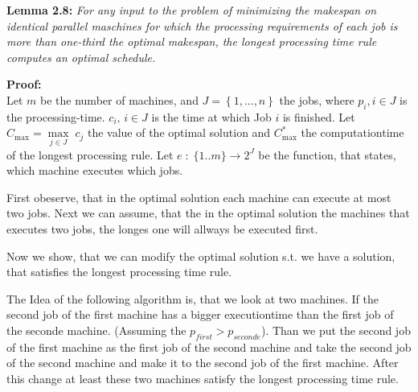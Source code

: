 \documentclass[11pt,a4paper,ngerman]{article}
\begin{document}
\begin{description}
    \item{\bfseries Lemma 2.8:} 
        {\rmfamily\itshape
            For any input to the problem of minimizing the makespan on
            identical parallel maschines for which the processing
            requirements of each job is more than one-third the 
            optimal makespan, the longest processing time rule
            computes an optimal schedule.
        }
    \item{\bfseries Proof:}\\
        Let $m$ be the number of machines, and 
        $J = \left\{ 1,... ,n\right\}$ the jobs, where $p_i, i \in J$
        is the processing-time. $c_i, \, i \in J$ is the time at which
        Job $i$ is finished.
        Let $C_{\max} = \underset{j\in J}{\max} \; c_j$ the value of the
        optimal solution and $C_{\max}^*$ the computationtime of the longest
        processing rule.
        Let $e \; : \; \{1..m\} \rightarrow 2^J $ be the function, that states, which
        machine executes which jobs.
 
    \vspace{2\lineskip}

        First obeserve, that in the optimal solution each machine can
        execute at most two jobs. Next we can assume, that the in the
        optimal solution the machines that executes two jobs, the
        longes one will allways be executed first.

    \vspace{2\lineskip}

        Now we show, that we can modify the optimal solution
        s.t. we have a solution, that satisfies the longest processing
        time rule.

    \vspace{2\lineskip}

        The Idea of the following algorithm is, that we look at two machines.
        If the second job of the first machine has a bigger executiontime
        than the first job of the seconde machine. (Assuming the $p_{first} > p_{seconde}$).
        Than we put the second job of the first machine as the first job of the second
        machine and take the second job of the second machine and make it to the second job
        of the first machine. After this change at least these two machines satisfy the
        longest processing time rule.


\end{description}
\end{document}
